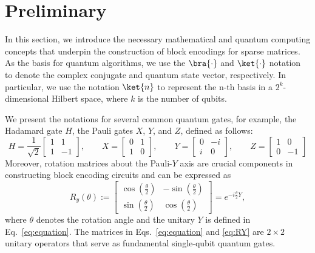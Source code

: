 \documentclass{article}
\begin{document}
    \section{Preliminary}\label{sec:preliminary}
    In this section, we introduce the necessary mathematical and quantum computing concepts that underpin the construction of block encodings for sparse matrices.
    As the basis for quantum algorithms, we use the $\bra{\cdot}$ and $\ket{\cdot}$ notation to denote the complex conjugate and quantum state vector, respectively. In particular, we use the notation $\ket{n}$ to represent the n-th basis in a $2^k$-dimensional Hilbert space, where $k$ is the number of qubits.

    We present the notations for several common quantum gates, for example, the Hadamard gate $H$, the Pauli gates $X$, $Y$, and $Z$, defined as follows:
    \begin{equation}
        H = \frac{1}{\sqrt{2}}
        \begin{bmatrix}
            1 & 1  \\
            1 & -1
        \end{bmatrix}, \qquad
        X =
        \begin{bmatrix}
            0 & 1 \\
            1 & 0
        \end{bmatrix}, \qquad
        Y =
        \begin{bmatrix}
            0 & -i \\
            i & 0
        \end{bmatrix}, \qquad
        Z =
        \begin{bmatrix}
            1 & 0  \\
            0 & -1
        \end{bmatrix}\label{eq:equation}
    \end{equation}
    Moreover, rotation matrices about the Pauli-$Y$ axis are crucial components in constructing block encoding circuits and can be expressed as
    \begin{equation}
        R_y(\theta) :=
        \begin{bmatrix}
            \cos\left(\frac{\theta}{2}\right) & -\sin\left(\frac{\theta}{2}\right) \\
            \sin\left(\frac{\theta}{2}\right) & \cos\left(\frac{\theta}{2}\right)
        \end{bmatrix}
        = e^{-i \frac{\theta}{2} Y}, \tag{2.2} \label{eq:RY}
    \end{equation}
    where $\theta$ denotes the rotation angle and the unitary $Y$ is defined in Eq.~\eqref{eq:equation}. The matrices in Eqs.~\eqref{eq:equation} and \eqref{eq:RY} are $2 \times 2$ unitary operators that serve as fundamental single-qubit quantum gates.
\end{document}

